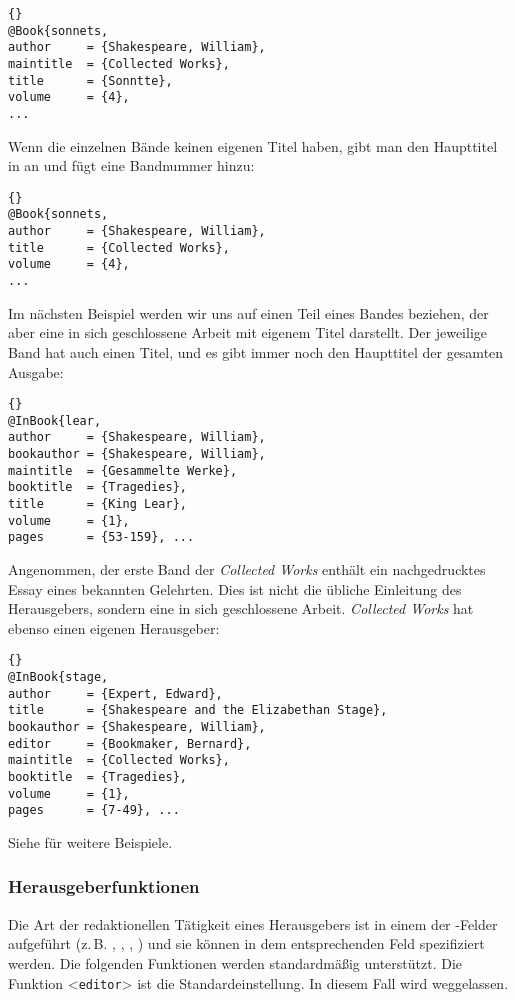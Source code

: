 \documentclass{ltxdockit}[2011/03/25]
\begin{document}
\begin{lstlisting}[style=bibtex]{} 
@Book{sonnets,
author     = {Shakespeare, William}, 
maintitle  = {Collected Works}, 
title      = {Sonntte},
volume     = {4}, 
...  
\end{lstlisting}
%
Wenn die einzelnen Bände keinen eigenen Titel haben, gibt man den Haupttitel in
 an und fügt eine Bandnummer hinzu:

\begin{lstlisting}[style=bibtex]{} 
@Book{sonnets, 
author     = {Shakespeare, William}, 
title      = {Collected Works}, 
volume     = {4}, 
...
\end{lstlisting}
%
Im nächsten Beispiel werden wir uns auf einen Teil eines Bandes beziehen, der
aber eine in sich geschlossene Arbeit mit eigenem Titel darstellt. Der jeweilige
Band hat auch einen Titel, und es gibt immer noch den Haupttitel der gesamten
Ausgabe:

\begin{lstlisting}[style=bibtex]{}
@InBook{lear, 
author     = {Shakespeare, William}, 
bookauthor = {Shakespeare, William}, 
maintitle  = {Gesammelte Werke},
booktitle  = {Tragedies}, 
title      = {King Lear}, 
volume     = {1}, 
pages      = {53-159}, ...  
\end{lstlisting}
%
Angenommen, der erste Band der \emph{Collected Works}  enthält ein
nachgedrucktes Essay eines bekannten Gelehrten. Dies ist nicht die übliche
Einleitung des Herausgebers, sondern eine in sich geschlossene Arbeit.
\emph{Collected Works} hat ebenso einen eigenen Herausgeber:

\begin{lstlisting}[style=bibtex]{} 
@InBook{stage, 
author     = {Expert, Edward},
title      = {Shakespeare and the Elizabethan Stage}, 
bookauthor = {Shakespeare, William}, 
editor     = {Bookmaker, Bernard}, 
maintitle  = {Collected Works},
booktitle  = {Tragedies}, 
volume     = {1}, 
pages      = {7-49}, ...
\end{lstlisting}
%
Siehe  für weitere Beispiele.

\subsubsection{Herausgeberfunktionen} \label{bib:use:edr}

Die Art der redaktionellen Tätigkeit eines Herausgebers ist in einem der
-Felder aufgeführt (z.\,B. ,
, , ) und sie können in dem
entsprechenden   Feld spezifiziert werden. Die folgenden
Funktionen werden standardmäßig unterstützt. Die Funktion <\texttt{editor}> ist
die Standardeinstellung. In diesem Fall wird  weggelassen.
\end{document}
